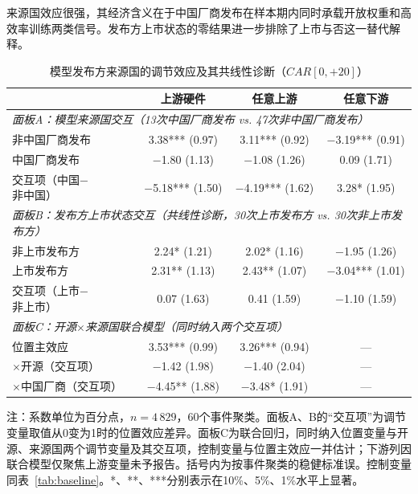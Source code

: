 \documentclass[11pt,fontset=fandol,a4paper]{ctexart}
\newcommand{\changed}[1]{#1}
\begin{document}
\changed{来源国效应很强，其经济含义在于中国厂商发布在样本期内同时承载开放权重和高效率训练两类信号。发布方上市状态的零结果进一步排除了上市与否这一替代解释。}

\begin{table}[H]
\centering
\small
\begin{threeparttable}
\caption{模型发布方来源国的调节效应及其共线性诊断（$CAR[0,+20]$）}
\label{tab:het_origin}
\begin{tabular}{lccc}
\toprule
 & 上游硬件 & 任意上游 & 任意下游 \\
\midrule
\multicolumn{4}{l}{\textit{面板A：模型来源国交互（13次中国厂商发布 vs. 47次非中国厂商发布）}} \\
非中国厂商发布 & 3.38*** (0.97) & 3.11*** (0.92) & $-$3.19*** (0.91) \\
中国厂商发布 & $-$1.80 (1.13) & $-$1.08 (1.26) & 0.09 (1.71) \\
交互项（中国$-$非中国） & $-$5.18*** (1.50) & $-$4.19*** (1.62) & 3.28* (1.95) \\[4pt]
\multicolumn{4}{l}{\textit{面板B：发布方上市状态交互（共线性诊断，30次上市发布方 vs. 30次非上市发布方）}} \\
非上市发布方 & 2.24* (1.21) & 2.02* (1.16) & $-$1.95 (1.26) \\
上市发布方 & 2.31** (1.13) & 2.43** (1.07) & $-$3.04*** (1.01) \\
交互项（上市$-$非上市） & 0.07 (1.63) & 0.41 (1.59) & $-$1.10 (1.59) \\[4pt]
\multicolumn{4}{l}{\textit{面板C：开源$\times$来源国联合模型（同时纳入两个交互项）}} \\
位置主效应 & 3.53*** (0.99) & 3.26*** (0.94) & --- \\
$\times$开源（交互项） & $-$1.42 (1.98) & $-$1.40 (2.04) & --- \\
$\times$中国厂商（交互项） & $-$4.45** (1.88) & $-$3.48* (1.91) & --- \\
\bottomrule
\end{tabular}
\begin{tablenotes}
\footnotesize
\item \changed{注：系数单位为百分点，$n=4\,829$，60个事件聚类。面板A、B的“交互项”为调节变量取值从0变为1时的位置效应差异。面板C为联合回归，同时纳入位置变量与开源、来源国两个调节变量及其交互项，控制变量与位置主效应一并估计；下游列因联合模型仅聚焦上游变量未予报告。括号内为按事件聚类的稳健标准误。控制变量同表~\ref{tab:baseline}。*、**、***分别表示在10\%、5\%、1\%水平上显著。}
\end{tablenotes}
\end{threeparttable}
\end{table}
\end{document}

